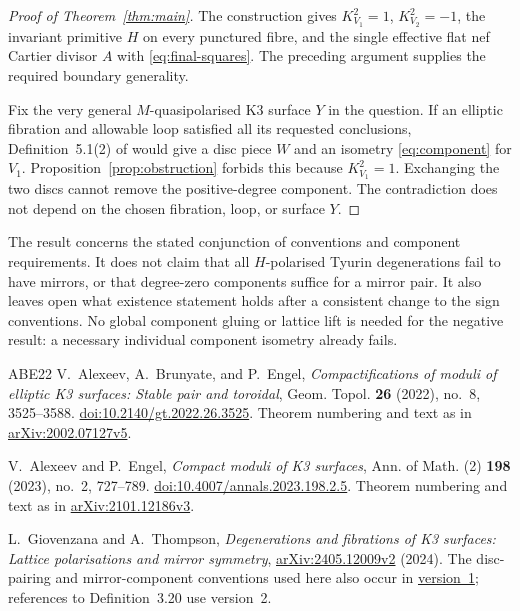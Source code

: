 \documentclass[11pt]{article}
\theoremstyle{definition}
\theoremstyle{remark}
\begin{document}
\begin{proof}[Proof of Theorem~\ref{thm:main}]
The construction gives $K_{V_1}^2=1$, $K_{V_2}^2=-1$, the invariant primitive $H$ on every punctured fibre, and the single effective flat nef Cartier divisor $A$ with \eqref{eq:final-squares}. The preceding argument supplies the required boundary generality.

Fix the very general $M$-quasipolarised K3 surface $Y$ in the question. If an elliptic fibration and allowable loop satisfied all its requested conclusions, Definition~5.1(2) of \cite{GT} would give a disc piece $W$ and an isometry \eqref{eq:component} for $V_1$. Proposition~\ref{prop:obstruction} forbids this because $K_{V_1}^2=1$. Exchanging the two discs cannot remove the positive-degree component. The contradiction does not depend on the chosen fibration, loop, or surface $Y$.
\end{proof}

The result concerns the stated conjunction of conventions and component requirements. It does not claim that all $H$-polarised Tyurin degenerations fail to have mirrors, or that degree-zero components suffice for a mirror pair. It also leaves open what existence statement holds after a consistent change to the sign conventions. No global component gluing or lattice lift is needed for the negative result: a necessary individual component isometry already fails.

\begin{thebibliography}{ABE22}
V.~Alexeev, A.~Brunyate, and P.~Engel,
\emph{Compactifications of moduli of elliptic K3 surfaces: Stable pair and toroidal},
Geom. Topol. \textbf{26} (2022), no.~8, 3525--3588.
\href{https://doi.org/10.2140/gt.2022.26.3525}{doi:10.2140/gt.2022.26.3525}.
Theorem numbering and text as in \href{https://arxiv.org/abs/2002.07127v5}{arXiv:2002.07127v5}.

V.~Alexeev and P.~Engel,
\emph{Compact moduli of K3 surfaces},
Ann. of Math. (2) \textbf{198} (2023), no.~2, 727--789.
\href{https://doi.org/10.4007/annals.2023.198.2.5}{doi:10.4007/annals.2023.198.2.5}.
Theorem numbering and text as in \href{https://arxiv.org/abs/2101.12186v3}{arXiv:2101.12186v3}.

L.~Giovenzana and A.~Thompson,
\emph{Degenerations and fibrations of K3 surfaces: Lattice polarisations and mirror symmetry},
\href{https://arxiv.org/abs/2405.12009v2}{arXiv:2405.12009v2} (2024).
The disc-pairing and mirror-component conventions used here also occur in
\href{https://arxiv.org/abs/2405.12009v1}{version~1}; references to Definition~3.20 use version~2.
\end{thebibliography}
\end{document}
